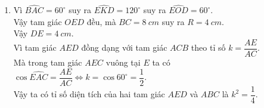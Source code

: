 \begin{ex}
{\begin{enumerate}
			\item Vì $ \widehat{BAC} = 60^\circ $ suy ra $ \widehat{EKD} = 120^\circ $ suy ra $ \widehat{EOD} = 60^\circ $.\\
			 Vậy tam giác $ OED $ đều, mà $ BC = 8\ cm $ suy ra $ R = 4\ cm $. \\
			 Vậy $ DE = 4\ cm $.\\
			Vì tam giác $ AED $ đồng dạng với tam giác $ ACB $ theo tỉ số $  k = \dfrac{AE}{AC} $.\\
			 Mà trong tam giác $ AEC $ vuông tại $ E $ ta có $ \cos \widehat{EAC} = \dfrac{AE}{AC} \Leftrightarrow k = \cos 60^\circ = \dfrac{1}{2} $.\\
			  Vậy ta có tỉ số diện tích của hai tam giác $ AED $ và $ ABC $ là $ k^2 = \dfrac{1}{4} $.
		\end{enumerate}	
	}
\end{ex}

